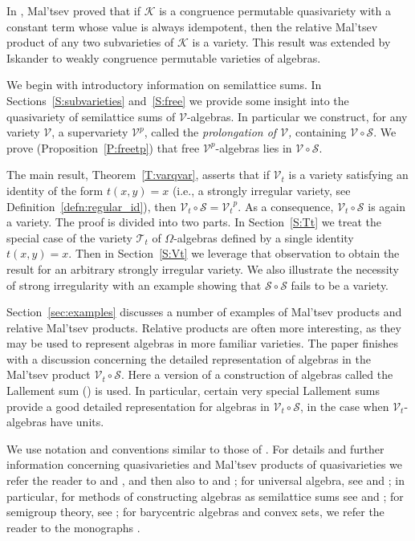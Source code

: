 \documentclass{birkau}
\newcommand{\mcV}{\mathcal{V}}
\newcommand{\mcK}{\mathcal{K}}
\newcommand{\mcT}{\mathcal{T}}
\newcommand{\mcS}{\mathcal{S}}
\newcommand{\pro}[1]{{#1}^p}
\theoremstyle{plain}
\theoremstyle{definition}
\numberwithin{equation}{section}
\begin{document}
In \cite{M67}, Mal'tsev proved that if $\mcK$ is a congruence permutable quasivariety with
a constant term whose value is always idempotent, then the relative Mal'tsev product of
any two subvarieties of $\mcK$ is a variety. This result was extended by Iskander
\cite{I84} to weakly congruence permutable varieties of algebras.



We begin with introductory information on semilattice sums. In
Sections~\ref{S:subvarieties} and~\ref{S:free} we provide some insight into the
quasivariety of semilattice sums of $\mcV$-algebras. In particular we construct, for any
variety $\mcV$, a supervariety $\pro{\mcV}$, called the \emph{prolongation of $\mcV$,}
containing $\mcV\circ \mcS$. We prove (Proposition~\ref{P:freetp}) that free
$\pro{\mcV}$-algebras lies in $\mcV \circ \mcS$.

The main result, Theorem~\ref{T:varqvar}, asserts that if $\mcV_t$ is a variety satisfying
an identity of the form $t(x,y)=x$ (i.e., a strongly irregular variety, see
Definition~\ref{defn:regular_id}), then $\mcV_t \circ \mcS = \pro{\mcV_t}$. As a
consequence, $\mcV_t \circ \mcS$ is again a variety. The proof is divided into two
parts. In Section~\ref{S:Tt} we treat the special case of the variety $\mcT_t$ of
$\Omega$-algebras defined by a single identity $t(x,y)=x$. Then in Section~\ref{S:Vt} we
leverage that observation to obtain the result for an arbitrary strongly irregular
variety. We also illustrate the necessity of strong irregularity with an example showing
that $\mcS \circ \mcS$ fails to be a variety.

Section~\ref{sec:examples} discusses a number of examples of Mal'tsev products and
relative Mal'tsev products. Relative products are often more interesting, as they may be
used to represent algebras in more familiar varieties.  The paper finishes with a
discussion concerning the detailed representation of algebras in the Mal'tsev product
$\mcV_t \circ \mcS$. Here a version of a construction of algebras called the Lallement sum
(\cite{RS85}) is used. In particular, certain very special Lallement sums provide a good
detailed representation for algebras in $\mcV_t \circ \mcS$, in the case when
$\mcV_t$-algebras have units.

We use notation and conventions similar to those of \cite{RS85, RS02}. For details and
further information concerning quasivarieties and Mal'tsev products of quasivarieties we
refer the reader to \cite{M67} and \cite{M71}, and then also to \cite{B18} and
\cite[Ch.~2]{RS02}; for universal algebra, see \cite{CB12} and \cite{RS02}; in particular,
for methods of constructing algebras as semilattice sums see \cite{PR92} and
\cite[Ch.~4]{RS02};  for semigroup theory, see \cite{CP61, H76, H95}; for
barycentric algebras and convex sets, we refer the reader to the monographs \cite{RS85,
  RS02}.
\end{document}
